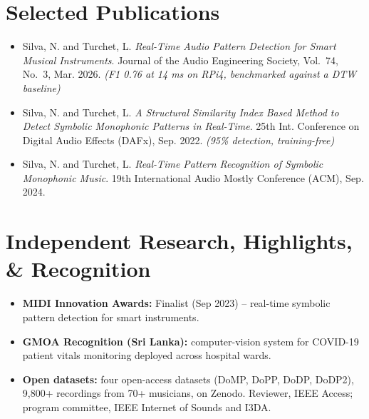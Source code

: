 \documentclass[11pt]{article}
\begin{document}
\section*{Selected Publications \footnotesize {}}
\begin{itemize}[leftmargin=1.2em, itemsep=-0.25em]
    \item Silva, N. and Turchet, L. \textit{Real-Time Audio Pattern Detection for Smart Musical Instruments}. Journal of the Audio Engineering Society, Vol.~74, No.~3, Mar. 2026. \textit{(F1 0.76 at 14 ms on RPi4, benchmarked against a DTW baseline)}
    \item Silva, N. and Turchet, L. \textit{A Structural Similarity Index Based Method to Detect Symbolic Monophonic Patterns in Real-Time}. 25th Int. Conference on Digital Audio Effects (DAFx), Sep. 2022. \textit{(95\% detection, training-free)}
    \item Silva, N. and Turchet, L. \textit{Real-Time Pattern Recognition of Symbolic Monophonic Music}. 19th International Audio Mostly Conference (ACM), Sep. 2024.
\end{itemize}

\vspace{-1em}
\section*{Independent Research, Highlights, \& Recognition}
\begin{itemize}[leftmargin=1.2em, itemsep=-0.25em]
    \item \textbf{MIDI Innovation Awards:} Finalist (Sep 2023) -- real-time symbolic pattern detection for smart instruments.
    \item \textbf{GMOA Recognition (Sri Lanka):} computer-vision system for COVID-19 patient vitals monitoring deployed across hospital wards.
    \item \textbf{Open datasets:} four open-access datasets (DoMP, DoPP, DoDP, DoDP2), 9,800+ recordings from 70+ musicians, on Zenodo. Reviewer, IEEE Access; program committee, IEEE Internet of Sounds and I3DA.
\end{itemize}
\end{document}
